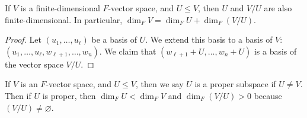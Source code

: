 \begin{proposition} \label{prp:quotientdim}
    If $V$ is a finite-dimensional $F$-vector space, and $U \leq V$, then $U$ and $V / U$ are also finite-dimensional.
    In particular, $\dim_F V = \dim_F U + \dim_F (V / U)$.
\end{proposition}
\begin{proof}
    Let $(u_1, \dots, u_\ell)$ be a basis of $U$.
    We extend this basis to a basis of $V$: $(u_1, \dots, u_\ell, w_{\ell + 1}, \dots, w_n)$.
    We claim that $(w_{\ell + 1} + U, \dots, w_n + U)$ is a basis of the vector space $V / U$.
\end{proof}

\begin{remark}
    If $V$ is an $F$-vector space, and $U \leq V$, then we say $U$ is a proper subspace if $U \neq V$.
    Then if $U$ is proper, then $\dim_F U < \dim_F V$ and $\dim_F ( V / U ) > 0$ because $(V/U) \neq \varnothing$.
\end{remark}

